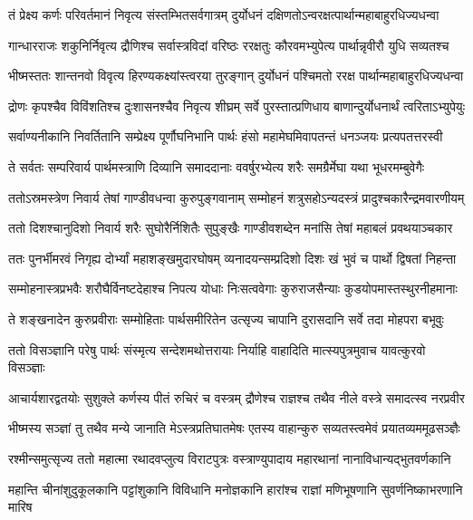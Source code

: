 \twolineshloka
{तं प्रेक्ष्य कर्णः परिवर्तमानं निवृत्य संस्तम्भितसर्वगात्रम्}
{दुर्योधनं दक्षिणतोऽन्वरक्षत्पार्थान्महाबाहुरधिज्यधन्वा}


\twolineshloka
{गान्धारराजः शकुनिर्निवृत्य द्रौणिश्च सर्वास्त्रविदां वरिष्ठः}
{ररक्षतुः कौरवमभ्युपेत्य पार्थान्नृवीरौ युधि सव्यतश्च}


\twolineshloka
{भीष्मस्ततः शान्तनवो विवृत्य हिरण्यकक्ष्यांस्त्वरया तुरङ्गान्}
{दुर्योधनं पश्चिमतो ररक्ष पार्थान्महाबाहुरधिज्यधन्वा}


\twolineshloka
{द्रोणः कृपश्चैव विविंशतिश्च दुःशासनश्चैव निवृत्य शीघ्रम्}
{सर्वे पुरस्तात्प्रणिधाय बाणान्दुर्योधनार्थं त्वरिताऽभ्युपेयुः}


\twolineshloka
{सर्वाण्यनीकानि निवर्तितानि सम्प्रेक्ष्य पूर्णौघनिभानि पार्थः}
{हंसो महामेघमिवापतन्तं धनञ्जयः प्रत्यपतत्तरस्वी}


\twolineshloka
{ते सर्वतः सम्परिवार्य पार्थमस्त्राणि दिव्यानि समाददानाः}
{ववर्षुरभ्येत्य शरैः समग्रैर्मेघा यथा भूधरमम्बुवेगैः}


\twolineshloka
{ततोऽस्रमस्त्रेण निवार्य तेषां गाण्डीवधन्वा कुरुपुङ्गवानाम्}
{सम्मोहनं शत्रुसहोऽन्यदस्त्रं प्रादुश्चकारैन्द्रमवारणीयम्}


\twolineshloka
{ततो दिशश्चानुदिशो निवार्य शरैः सुघोरैर्निशितैः सुपुङ्खैः}
{गाण्डीवशब्देन मनांसि तेषां महाबलं प्रवथयाञ्चकार}


\twolineshloka
{ततः पुनर्भीमरवं निगृह्य दोर्भ्यां महाशङ्खमुदारघोषम्}
{व्यनादयन्सम्प्रदिशो दिशः खं भुवं च पार्थो द्विषतां निहन्ता}


\twolineshloka
{सम्मोहनास्त्रप्रभवैः शरौघैर्विनष्टदेहाश्च निपत्य योधाः}
{निःसत्ववेगाः कुरुराजसैन्याः कुडयोपमास्तस्थुरनीहमानाः}


\twolineshloka
{ते शङ्खनादेन कुरुप्रवीराः सम्मोहिताः पार्थसमीरितेन}
{उत्सृज्य चापानि दुरासदानि सर्वे तदा मोहपरा बभूवुः}


\twolineshloka
{ततो विसञ्ज्ञानि परेषु पार्थः संस्मृत्य सन्देशमथोत्तरायाः}
{निर्याहि वाहादिति मात्स्यपुत्रमुवाच यावत्कुरवो विसञ्ज्ञाः}


\twolineshloka
{आचार्यशारद्वतयोः सुशुक्ले कर्णस्य पीतं रुचिरं च वस्त्रम्}
{द्रौणेश्च राज्ञश्च तथैव नीले वस्त्रे समादत्स्व नरप्रवीर}


\twolineshloka
{भीष्मस्य सञ्ज्ञां तु तथैव मन्ये जानाति मेऽस्त्रप्रतिघातमेषः}
{एतस्य वाहान्कुरु सव्यतस्त्वमेवं प्रयातव्यममूढसञ्ज्ञैः}


\twolineshloka
{रश्मीन्समुत्सृज्य ततो महात्मा रथादवप्लुत्य विराटपुत्रः}
{वस्त्राण्युपादाय महारथानां नानाविधान्यद्भुतवर्णकानि}


\twolineshloka
{महान्ति चीनांशुदुकूलकानि पट्टांशुकानि विविधानि मनोज्ञकानि}
{हारांश्च राज्ञां मणिभूषणानि सुवर्णनिष्काभरणानि मारिष}


